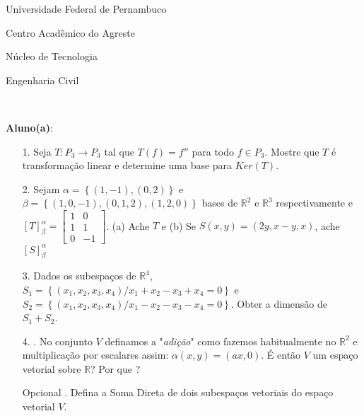 \documentclass[oneside,a4paper,12pt]{article}
\newcommand{\universidade}{Universidade Federal de Pernambuco}
\newcommand{\centro}{Centro Acadêmico do Agreste}
\newcommand{\departamento}{Núcleo de Tecnologia}
\newcommand{\curso}{Engenharia Civil}
\begin{document}
	\pagestyle{empty}
	
	\begin{center}
	 	\vspace{0pt}
	 	
		\universidade
		\par
		\centro
		\par
		\departamento
		\par
		\curso
		\par
		\vspace{08pt}
		\\
	\end{center}
	
	
	\begin{flushleft}
		\textbf{Aluno(a)}:
	\end{flushleft}
	
\begin{itemize}
\item[1.]  Seja $T:P_{3}\longrightarrow P_{3} $ tal que $T(f)=f''$ para todo $f\in P_{3}$. Mostre que $T$ é transformação linear e determine uma base para $Ker(T)$.
\end{itemize}
\begin{itemize}
\item[2.] Sejam $\alpha=\left\lbrace (1,-1),(0,2) \right\rbrace $ e $\beta=\left\lbrace (1,0,-1),(0,1,2), (1,2,0)\right\rbrace $ bases de $\mathbb{R}^{2} $ e $\mathbb{R}^{3}$ respectivamente e\\ $[T]^{\alpha}_{\beta}=\begin{bmatrix}
	1       & 0 \\
	1       & 1 \\
	0       & -1
\end{bmatrix}$. (a) Ache $T$ e (b) Se $S(x,y)=(2y,x-y,x)$, ache $[S]^{\alpha}_{\beta}$
 \end{itemize}
 \begin{itemize}
\item [3.] Dados os subespaços de $\mathbb{R}^{4}$, $S_{1}=\left\lbrace (x_{1},x_{2},x_{3},x_{4}) / x_{1}+x_{2}-x_{3}+x_{4}=0 \right\rbrace $ e\\ $S_{2}=\left\lbrace (x_{1},x_{2},x_{3},x_{4}) / x_{1}-x_{2}-x_{3}-x_{4}=0 \right\rbrace $. Obter a dimensão de $S_{1}+S_{2}$.
\end{itemize}
\begin{itemize}
\item[4.]. No conjunto $V$ definamos a "\textit{adição}" como fazemos habitualmente no $ \mathbb{R}^{2}$ e multiplicação por escalares assim: $\alpha (x,y)=(ax,0)$. É então $V$ um espaço vetorial sobre $ \mathbb{R}$? Por que ?

\end{itemize}
\begin{itemize}
	\item[Opcional]. Defina a Soma Direta de dois subespaços vetoriais do espaço vetorial $V$.
	
\end{itemize}
	\flushbottom
	\flushright
    
\end{document}
